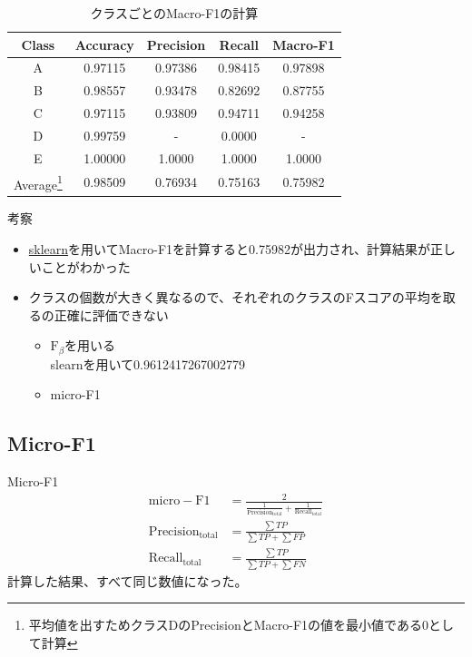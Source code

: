 \documentclass[leno,xcolor=dvipsnames]{beamer}
\begin{document}
  \begin{frame}
    \begin{table}[H]
      \centering
      \caption{クラスごとのMacro-F1の計算} \label{tb:macro-F1}
      \begin{tabular}{ccccc}
        \toprule
        Class & Accuracy & Precision & Recall & Macro-F1 \\
        \midrule
        A & 0.97115 & 0.97386 & 0.98415 & 0.97898 \\
        B & 0.98557 & 0.93478 & 0.82692 & 0.87755 \\
        C & 0.97115 & 0.93809 & 0.94711 & 0.94258 \\
        D & 0.99759 & - & 0.0000 & - \\
        E & 1.00000 & 1.0000 & 1.0000 & 1.0000 \\
        \midrule
        Average\footnote{平均値を出すためクラスDのPrecisionとMacro-F1の値を最小値である0として計算} & 0.98509 & 0.76934 & 0.75163 & 0.75982 \\
        \bottomrule
      \end{tabular}
    \end{table}
  \end{frame}

  \begin{frame}{考察}
    \begin{itemize}
      \item \href{https://scikit-learn.org/stable/modules/generated/sklearn.metrics.f1_score.html}{sklearn}を用いてMacro-F1を計算すると0.75982が出力され、計算結果が正しいことがわかった
      \item クラスの個数が大きく異なるので、それぞれのクラスのFスコアの平均を取るの正確に評価できない
      \begin{itemize}
        \item \href{https://www.ibm.com/docs/en/cloud-paks/cp-data/3.5.0?topic=overview-weighted-f1-measure}{$\mathrm{F}_{\beta}$}を用いる \mbox{}\\ slearnを用いて0.9612417267002779
        \item micro-F1
      \end{itemize}
    \end{itemize}
  \end{frame}

  \begin{frame}
    \section{Micro-F1}
  \end{frame}
  
  \begin{frame}{Micro-F1}
    \begin{align*}
      \mathrm{micro-F1} &= \frac{2}{\frac{1}{\mathrm{Precision}_{\mathrm{total}}} + \frac{1}{\mathrm{Recall}_{\mathrm{total}}}} \\
      \mathrm{Precision}_{\mathrm{total}} &= \frac{\sum TP}{\sum TP + \sum FP} \\
      \mathrm{Recall}_{\mathrm{total}} &= \frac{\sum TP}{\sum TP + \sum FN}
    \end{align*}
    計算した結果、すべて同じ数値になった。
  \end{frame}
\end{document}
